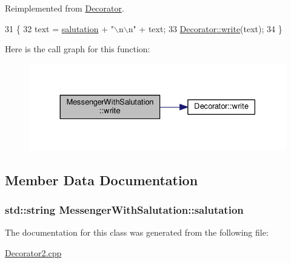Reimplemented from \hyperlink{classDecorator_ae5cad6daee450fb5eaa2b1cad6a0dd45}{Decorator}.


\begin{DoxyCode}
31                                                       \{
32             text = \hyperlink{classMessengerWithSalutation_af3a570c7b7a40656b029803aa8419c43}{salutation} + \textcolor{stringliteral}{"\(\backslash\)n\(\backslash\)n"} + text;
33             \hyperlink{classDecorator_ae5cad6daee450fb5eaa2b1cad6a0dd45}{Decorator::write}(text);
34         \}
\end{DoxyCode}


Here is the call graph for this function\+:
\nopagebreak
\begin{figure}[H]
\begin{center}
\leavevmode
\includegraphics[width=330pt]{classMessengerWithSalutation_aed33b1b35b9c5c24f80a3e898aed2487_cgraph}
\end{center}
\end{figure}




\subsection{Member Data Documentation}
\subsubsection[{\texorpdfstring{salutation}{salutation}}]{\setlength{\rightskip}{0pt plus 5cm}std\+::string Messenger\+With\+Salutation\+::salutation\hspace{0.3cm}{\ttfamily [private]}}\hypertarget{classMessengerWithSalutation_af3a570c7b7a40656b029803aa8419c43}{}\label{classMessengerWithSalutation_af3a570c7b7a40656b029803aa8419c43}


The documentation for this class was generated from the following file\+:\begin{DoxyCompactItemize}
\item 
\hyperlink{Decorator2_8cpp}{Decorator2.\+cpp}\end{DoxyCompactItemize}

